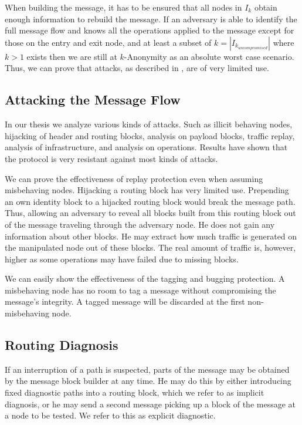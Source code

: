 \documentclass[runningheads]{llncs}
\begin{document}
When building the message, it has to be ensured that all nodes in $I_k$ obtain enough information to rebuild the message. If an adversary is able to identify the full message flow and knows all the operations applied to the message except for those on the entry and exit node, and at least a subset of $k=|I_{k_{uncompromised}}|$ where $k>1$ exists then we are still at $k$-Anonymity as an absolute worst case scenario. Thus, we can prove that attacks, as described in \cite{DanSer04}, are of very limited use. 

\subsection{Attacking the Message Flow}
In our thesis\cite{messageVortex} we analyze various kinds of attacks. Such as illicit behaving nodes, hijacking of header and routing blocks, analysis on payload blocks, traffic replay, analysis of infrastructure, and analysis on operations. Results have shown that the protocol is very resistant against most kinds of attacks.

We can  prove the effectiveness of replay protection even when assuming misbehaving nodes. Hijacking a routing block has very limited use. Prepending an own identity block to a hijacked routing block would break the message path. Thus, allowing an adversary to reveal all blocks built from this routing block out of the message traveling through the adversary node. He does not gain any information about other blocks. He may extract how much traffic is generated on the manipulated node out of these blocks. The real amount of traffic is, however, higher as some operations may have failed due to missing blocks.

We can easily show the effectiveness of the tagging and bugging protection. A misbehaving node has no room to tag a message without compromising the message's integrity. A tagged message will be discarded at the first non-misbehaving node.

\subsection{Routing Diagnosis}
If an interruption of a path is suspected, parts of the message may be obtained by the message block builder at any time. He may do this by either introducing fixed diagnostic paths into a routing block, which we refer to as implicit diagnosis, or he may send a second message picking up a block of the message at a node to be tested. We refer to this as explicit diagnostic.
\end{document}
